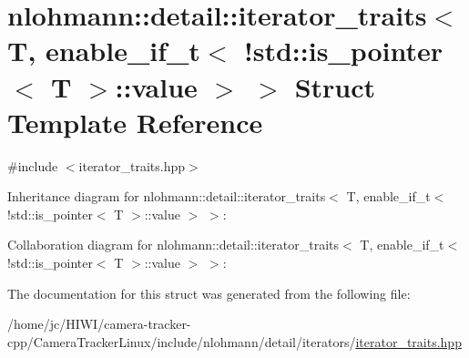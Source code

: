\hypertarget{structnlohmann_1_1detail_1_1iterator__traits_3_01_t_00_01enable__if__t_3_01_9std_1_1is__pointer_3_01_t_01_4_1_1value_01_4_01_4}{}\section{nlohmann\+:\+:detail\+:\+:iterator\+\_\+traits$<$ T, enable\+\_\+if\+\_\+t$<$ !std\+:\+:is\+\_\+pointer$<$ T $>$\+:\+:value $>$ $>$ Struct Template Reference}
\label{structnlohmann_1_1detail_1_1iterator__traits_3_01_t_00_01enable__if__t_3_01_9std_1_1is__pointer_3_01_t_01_4_1_1value_01_4_01_4}


{\ttfamily \#include $<$iterator\+\_\+traits.\+hpp$>$}



Inheritance diagram for nlohmann\+:\+:detail\+:\+:iterator\+\_\+traits$<$ T, enable\+\_\+if\+\_\+t$<$ !std\+:\+:is\+\_\+pointer$<$ T $>$\+:\+:value $>$ $>$\+:


Collaboration diagram for nlohmann\+:\+:detail\+:\+:iterator\+\_\+traits$<$ T, enable\+\_\+if\+\_\+t$<$ !std\+:\+:is\+\_\+pointer$<$ T $>$\+:\+:value $>$ $>$\+:


The documentation for this struct was generated from the following file\+:\begin{DoxyCompactItemize}
\item 
/home/jc/\+H\+I\+W\+I/camera-\/tracker-\/cpp/\+Camera\+Tracker\+Linux/include/nlohmann/detail/iterators/\hyperlink{iterator__traits_8hpp}{iterator\+\_\+traits.\+hpp}\end{DoxyCompactItemize}

